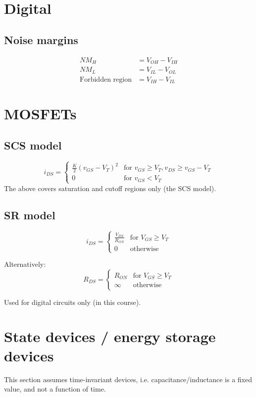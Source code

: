 \documentclass[12pt,a4paper]{report}
\begin{document}
\section{Digital}

\subsection{Noise margins}
\begin{align*}
  NM_H &= V_{OH} - V_{IH}\\
  NM_L &= V_{IL} - V_{OL}\\
\text{Forbidden region} &= V_{IH} - V_{IL}
\end{align*}

\section{MOSFETs}

\subsection{SCS model}
\[ 
 i_{DS} = \begin{cases}
   \frac{K}{2}(v_{GS} - V_T)^2 & \text{for $v_{GS} \ge V_T, v_{DS} \ge v_{GS} - V_T$} \\
   0 & \text{for $v_{GS} < V_T$}
 \end{cases}
\]
The above covers saturation and cutoff regions only (the SCS model).

\subsection{SR model}

\[ 
  i_{DS} = \begin{cases}
  \frac{V_{DS}}{R_{ON}} & \text{for $V_{GS} \ge V_T$} \\
  0 & \text{otherwise}
  \end{cases}
\]

Alternatively:
\[ 
  R_{DS} = \begin{cases}
  R_{ON} & \text{for $V_{GS} \ge V_T$} \\
  \infty & \text{otherwise}
  \end{cases}
\]

Used for digital circuits only (in this course).

\section{State devices / energy storage devices}
This section assumes time-invariant devices, i.e. capacitance/inductance is a fixed value, and not a function of time.
\end{document}
